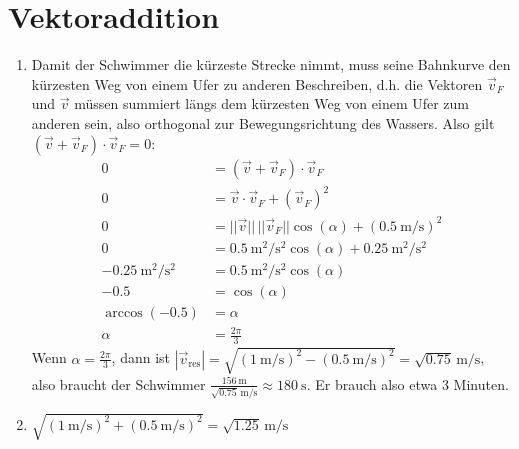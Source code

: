 \documentclass[sectionformat = Aufgabe]{gadsescript}
\begin{document}
\section{Vektoraddition}
\begin{enumerate}[label=\alph*)]
	\item Damit der Schwimmer die kürzeste Strecke nimmt, muss seine Bahnkurve den kürzesten Weg von einem Ufer zu anderen Beschreiben, d.h. die Vektoren $\vec v_F $ und $ \vec v $ müssen summiert längs dem kürzesten Weg von einem Ufer zum anderen sein, also orthogonal zur Bewegungsrichtung des Wassers. Also gilt $\left(\vec v + \vec v_F\right) \cdot \vec v_F = 0 $:
		\begin{align*}
			0 &= \left( \vec v + \vec v_F \right) \cdot \vec v_F\\
			0 &= \vec v \cdot \vec v_F + \left(\vec v_F \right)^2\\
			0 &= ||\vec v|| \, ||\vec v_F|| \cos(\alpha) + \left(\qty{0.5}{\metre\per\second}\right)^2\\
			0 &= \qty{0.5}{\square\metre\per\square\second} \cos(\alpha) + \qty{0.25}{\square\metre\per\square\second}\\
			\qty{-0.25}{\square\metre\per\square\second} &= \qty{0.5}{\square\metre\per\square\second} \cos(\alpha)\\
			-0.5 &= \cos(\alpha)\\
			\arccos(-0.5) &= \alpha\\
			\alpha &= \frac{2\pi}{3}
		\end{align*}
		Wenn $\alpha = \frac{2\pi}{3}$, dann ist $ |\vec v_{\text{res}}| = \sqrt{\left(\qty{1}{\metre\per\second}\right)^2 - \left(\qty{0.5}{\metre\per\second} \right)^2} = \sqrt{0.75}\,\unit{\metre\per\second} $, also braucht der Schwimmer $\frac{\qty{156}{\metre}}{\sqrt{0.75}\,\unit{\metre\per\second}} \approx \qty{180}{\second}$. Er brauch also etwa 3 Minuten.
	\item $\sqrt{\left(\qty{1}{\metre\per\second}\right)^2 + \left(\qty{0.5}{\metre\per\second}\right)^2} = \sqrt{1.25}\,\unit{\metre\per\second} $

\end{enumerate}
\end{document}
